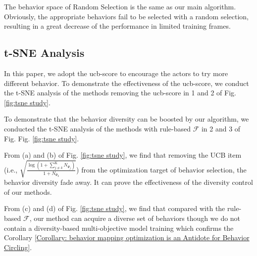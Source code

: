 The behavior space of Random Selection is the same as our main algorithm. Obviously, the appropriate behaviors fail to be selected with a random selection, resulting in a great decrease of the performance in limited training frames.


\subsection{t-SNE Analysis}
\label{app: TSNE Analysis}



 In this paper, we adopt the ucb-score to encourage the actors to try more different behavior. To demonstrate the effectiveness of the ucb-score, we conduct the t-SNE analysis of the methods removing the ucb-score in 1 and 2 of  Fig. \ref{fig:tsne study}. 

 To demonstrate that the behavior diversity can be boosted by our algorithm, we conducted  the t-SNE analysis of the methods with rule-based $\mathcal{F}$ in 2 and 3 of Fig. Fig. \ref{fig:tsne study}. 
 
 
From (a) and (b) of Fig. \ref{fig:tsne study}, we find that removing the UCB item (i.e., $\sqrt{\frac{\log (1 + \sum_{j \neq k}^{\mathrm{K}} N_{\Psi_j})}{1 + N_{\Psi_k}}}$) from the optimization target of behavior selection, the behavior diversity fade away. It can prove the effectiveness of the diversity control of our methods.


From (c) and (d) of Fig. \ref{fig:tsne study}, we find that compared with the rule-based $\mathcal{F}$, our method can acquire a diverse set of behaviors though we do not contain a diversity-based multi-objective model training which confirms the Corollary \ref{Corollary: behavior mapping optimization is an Antidote for Behavior Circling}.





\begin{figure*}[!t]
\vspace{-0.1in}
\caption{Visualizing Behavior Diversity via t-SNE. (a) and (b) are drawn from the t-SNE analysis of visited states (points highlighted  with ) in  Chopper Command, and (c) and (d) are drawn the t-SNE analysis of visited states in Atlantis.}
\label{fig:tsne study}
\end{figure*}






